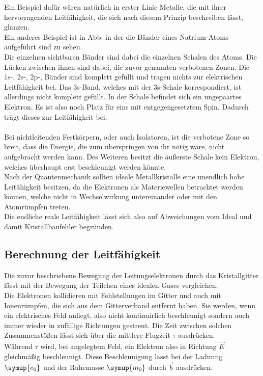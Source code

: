 \noindent
Ein Beispiel dafür wären natürlich in erster Linie Metalle, die mit ihrer hervorragenden Leitfähigkeit, die sich nach diesem Prinzip beschreiben lässt, glänzen.\\
Ein anderes Beispiel ist in Abb. in der die Bänder eines Natrium-Atoms aufgeführt sind zu sehen.\\
Die einzelnen sichtbaren Bänder sind dabei die einzelnen Schalen des Atoms.
Die Lücken zwischen ihnen sind dabei, die zuvor genannten verbotenen Zonen.
Die 1s-, 2s-, 2p-, Bänder sind komplett gefüllt und tragen nichts zur elektrischen Leitfähigkeit bei.
Das 3s-Band, welches mit der 3s-Schale korrespondiert, ist allerdings nicht komplett gefüllt.
In der Schale befindet sich ein ungepaartes Elektron. Es ist also noch Platz für eins mit entgegengesetztem Spin.
Dadurch trägt dieses zur Leitfähigkeit bei.\\\\
\noindent
Bei nichtleitenden Festkörpern, oder auch Isolatoren, ist die verbotene Zone so breit, dass die Energie, 
die zum überspringen von ihr nötig wäre, nicht aufgebracht werden kann. Des Weiteren besitzt die äußerste Schale kein Elektron, welches
überhaupt erst beschleunigt werden könnte.\\
Nach der Quantenmechanik sollten ideale Metallkristalle eine unendlich hohe Leitähigkeit besitzen, da
die Elektronen als Materiewellen betrachtet werden können, welche nicht in Wechselwirkung untereinander oder mit den Atomrümpfen treten.\\
Die endliche reale Leitfähigkeit lässt sich also auf Abweichungen vom Ideal und damit Kristallbaufehler begründen.\\


\subsection{Berechnung der Leitfähigkeit}

Die zuvor beschriebene Bewegung der Leitungselektronen durch das Kristallgitter lässt 
mit der Bewegung der Teilchen eines idealen Gases vergleichen.\\
Die Elektronen kollidieren mit Fehlstellungen im Gitter und auch mit Ionenrümpfen, die sich aus dem Gitterverband entfernt haben.
Sie werden, wenn ein elektrisches Feld anliegt, also nicht kontinuirlich beschleunigt sondern auch immer wieder in zufällige Richtungen gestreut.
Die Zeit zwischen solchen Zusammenstößen lässt sich über die mittlere Flugzeit $\overline{\tau}$ ausdrücken.\\
Während $\overline{\tau}$ wird, bei angelegtem Feld, ein Elektron also in Richtung $\vec{E}$ gleichmäßig beschleunigt.
Diese Beschleunigung lässt bei der Ladunng $\symup{e_0}$ und der Ruhemasse $\symup{m_0}$ durch $\vec{b}$ ausdrücken.

